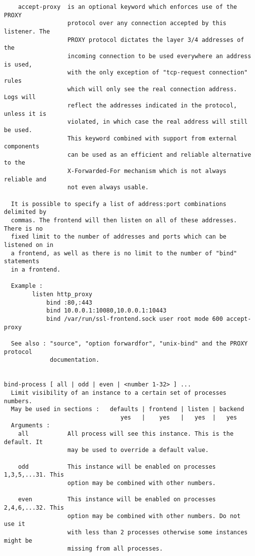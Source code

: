\begin{verbatim}
    accept-proxy  is an optional keyword which enforces use of the PROXY
                  protocol over any connection accepted by this listener. The
                  PROXY protocol dictates the layer 3/4 addresses of the
                  incoming connection to be used everywhere an address is used,
                  with the only exception of "tcp-request connection" rules
                  which will only see the real connection address. Logs will
                  reflect the addresses indicated in the protocol, unless it is
                  violated, in which case the real address will still be used.
                  This keyword combined with support from external components
                  can be used as an efficient and reliable alternative to the
                  X-Forwarded-For mechanism which is not always reliable and
                  not even always usable.

  It is possible to specify a list of address:port combinations delimited by
  commas. The frontend will then listen on all of these addresses. There is no
  fixed limit to the number of addresses and ports which can be listened on in
  a frontend, as well as there is no limit to the number of "bind" statements
  in a frontend.

  Example :
        listen http_proxy
            bind :80,:443
            bind 10.0.0.1:10080,10.0.0.1:10443
            bind /var/run/ssl-frontend.sock user root mode 600 accept-proxy

  See also : "source", "option forwardfor", "unix-bind" and the PROXY protocol
             documentation.


bind-process [ all | odd | even | <number 1-32> ] ...
  Limit visibility of an instance to a certain set of processes numbers.
  May be used in sections :   defaults | frontend | listen | backend
                                 yes   |    yes   |   yes  |   yes
  Arguments :
    all           All process will see this instance. This is the default. It
                  may be used to override a default value.

    odd           This instance will be enabled on processes 1,3,5,...31. This
                  option may be combined with other numbers.

    even          This instance will be enabled on processes 2,4,6,...32. This
                  option may be combined with other numbers. Do not use it
                  with less than 2 processes otherwise some instances might be
                  missing from all processes.


\end{verbatim}
